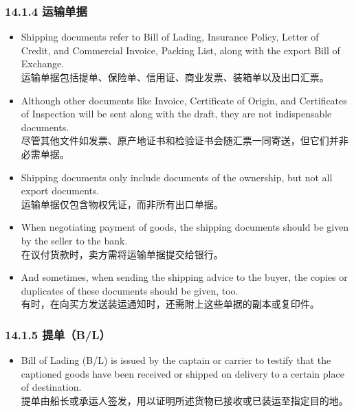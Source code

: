 \documentclass[12pt]{beamer}
\begin{document}
    \begin{frame}[allowframebreaks]
    \frametitle{14.1.4 运输单据}
    \begin{itemize}
    \item Shipping documents refer to Bill of Lading, Insurance Policy, Letter of Credit, and Commercial Invoice, Packing List, along with the export Bill of Exchange. \\
    运输单据包括提单、保险单、信用证、商业发票、装箱单以及出口汇票。
    
    \item Although other documents like Invoice, Certificate of Origin, and Certificates of Inspection will be sent along with the draft, they are not indispensable documents. \\
    尽管其他文件如发票、原产地证书和检验证书会随汇票一同寄送，但它们并非必需单据。
    
    \item Shipping documents only include documents of the ownership, but not all export documents. \\
    运输单据仅包含物权凭证，而非所有出口单据。
    
    \item When negotiating payment of goods, the shipping documents should be given by the seller to the bank. \\
    在议付货款时，卖方需将运输单据提交给银行。
    
    \item And sometimes, when sending the shipping advice to the buyer, the copies or duplicates of these documents should be given, too. \\
    有时，在向买方发送装运通知时，还需附上这些单据的副本或复印件。
    \end{itemize}
    \end{frame}
    
    \begin{frame}[allowframebreaks]
    \frametitle{14.1.5 提单（B/L）}
    \begin{itemize}
    \item Bill of Lading (B/L) is issued by the captain or carrier to testify that the captioned goods have been received or shipped on delivery to a certain place of destination. \\
    提单由船长或承运人签发，用以证明所述货物已接收或已装运至指定目的地。
    \end{itemize}
    \end{frame}
\end{document}
